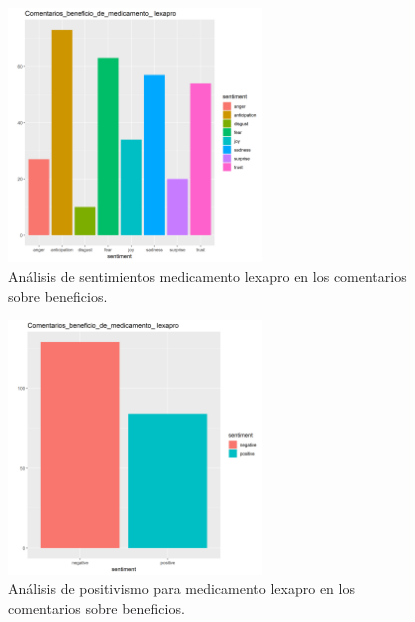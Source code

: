 \documentclass[spanish,]{article}
\begin{document}
\begin{figure}[h]
    \centering
    \includegraphics[width=0.6\textwidth]{figuras/sentimientos/Alexapro1.png}
    \caption{Análisis de sentimientos medicamento lexapro en los comentarios sobre beneficios.}
    \label{fig:sentimientos:25}
\end{figure}

\begin{figure}[h]
    \centering
    \includegraphics[width=0.6\textwidth]{figuras/sentimientos/Alexapro2.png}
    \caption{Análisis de positivismo para medicamento lexapro en los comentarios sobre beneficios.}
    \label{fig:sentimientos:26}
\end{figure}
\end{document}
